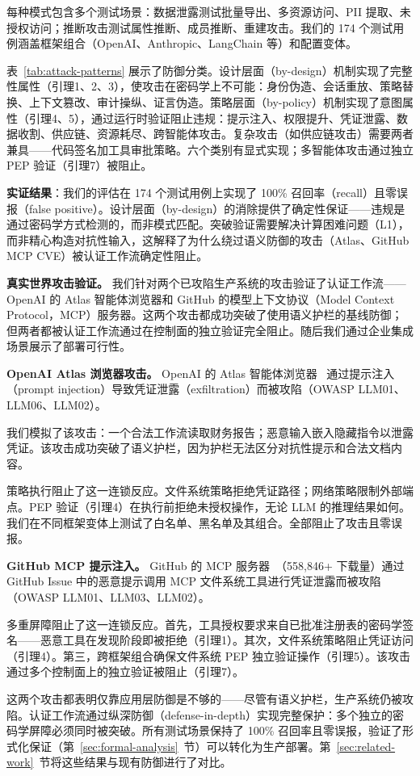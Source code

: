 每种模式包含多个测试场景：数据泄露测试批量导出、多资源访问、PII 提取、未授权访问；推断攻击测试属性推断、成员推断、重建攻击。我们的 174 个测试用例涵盖框架组合（OpenAI、Anthropic、LangChain 等）和配置变体。

表~\ref{tab:attack-patterns} 展示了防御分类。设计层面（by-design）机制实现了完整性属性（引理1、2、3），使攻击在密码学上不可能：身份伪造、会话重放、策略替换、上下文篡改、审计操纵、证言伪造。策略层面（by-policy）机制实现了意图属性（引理4、5），通过运行时验证阻止违规：提示注入、权限提升、凭证泄露、数据收割、供应链、资源耗尽、跨智能体攻击。复杂攻击（如供应链攻击）需要两者兼具——代码签名加工具审批策略。六个类别有显式实现；多智能体攻击通过独立 PEP 验证（引理7）被阻止。

\textbf{实证结果}：我们的评估在 174 个测试用例上实现了 100\% 召回率（recall）且零误报（false positive）。设计层面（by-design）的消除提供了确定性保证——违规是通过密码学方式检测的，而非模式匹配。突破验证需要解决计算困难问题（L1），而非精心构造对抗性输入，这解释了为什么绕过语义防御的攻击（Atlas、GitHub MCP CVE）被认证工作流确定性阻止。

\noindent\textbf{真实世界攻击验证。} 我们针对两个已攻陷生产系统的攻击验证了认证工作流——OpenAI 的 Atlas 智能体浏览器和 GitHub 的模型上下文协议（Model Context Protocol，MCP）服务器。这两个攻击都成功突破了使用语义护栏的基线防御；但两者都被认证工作流通过在控制面的独立验证完全阻止。随后我们通过企业集成场景展示了部署可行性。

\noindent\textbf{OpenAI Atlas 浏览器攻击。} OpenAI 的 Atlas 智能体浏览器~\cite{atlas-cve} 通过提示注入（prompt injection）导致凭证泄露（exfiltration）而被攻陷（OWASP LLM01、LLM06、LLM02）。

我们模拟了该攻击：一个合法工作流读取财务报告；恶意输入嵌入隐藏指令以泄露凭证。该攻击成功突破了语义护栏，因为护栏无法区分对抗性提示和合法文档内容。

策略执行阻止了这一连锁反应。文件系统策略拒绝凭证路径；网络策略限制外部端点。PEP 验证（引理4）在执行前拒绝未授权操作，无论 LLM 的推理结果如何。我们在不同框架变体上测试了白名单、黑名单及其组合。全部阻止了攻击且零误报。

\noindent\textbf{GitHub MCP 提示注入。} GitHub 的 MCP 服务器~\cite{github-mcp-cve}（558,846+ 下载量）通过 GitHub Issue 中的恶意提示调用 MCP 文件系统工具进行凭证泄露而被攻陷（OWASP LLM01、LLM03、LLM02）。

多重屏障阻止了这一连锁反应。首先，工具授权要求来自已批准注册表的密码学签名——恶意工具在发现阶段即被拒绝（引理1）。其次，文件系统策略阻止凭证访问（引理4）。第三，跨框架组合确保文件系统 PEP 独立验证操作（引理5）。该攻击通过多个控制面上的独立验证被阻止（引理7）。

这两个攻击都表明仅靠应用层防御是不够的——尽管有语义护栏，生产系统仍被攻陷。认证工作流通过纵深防御（defense-in-depth）实现完整保护：多个独立的密码学屏障必须同时被突破。所有测试场景保持了 100\% 召回率且零误报，验证了形式化保证（第~\ref{sec:formal-analysis}~节）可以转化为生产部署。第~\ref{sec:related-work}~节将这些结果与现有防御进行了对比。
